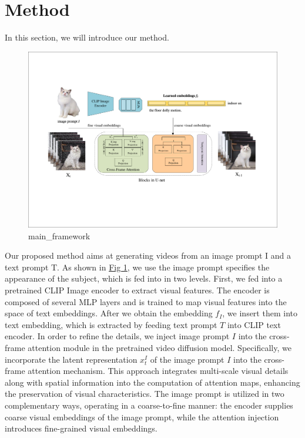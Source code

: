 \section{Method}
In this section, we will introduce our method.

\begin{figure}
    \label{main_framework}
    \includegraphics[width=\linewidth]{fig/main_framework.pdf}
    \caption{main\_framework}
\end{figure}

Our proposed method aims at generating videos from an image prompt I and a text prompt T. As shown in \hyperref[main_framework]{Fig 1}, we use the image prompt specifies the appearance of the subject, which is fed into in two levels. First, we fed into a pretrained CLIP Image encoder to extract visual features. The encoder is composed of several MLP layers and is trained to map visual features into the space of text embeddings. After we obtain the embedding $f_I$, we insert them into text embedding, which is extracted by feeding text prompt $T$ into CLIP text encoder. In order to refine the details, we inject image prompt $I$ into the cross-frame attention module in the pretrained video diffusion model. Specifically, we incorporate the latent representation $x_t^I$ of the image prompt $I$ into the cross-frame attention mechanism. This approach integrates multi-scale visual details along with spatial information into the computation of attention maps, enhancing the preservation of visual characteristics. The image prompt is utilized in two complementary ways, operating in a coarse-to-fine manner: the encoder supplies coarse visual embeddings of the image prompt, while the attention injection introduces fine-grained visual embeddings.

